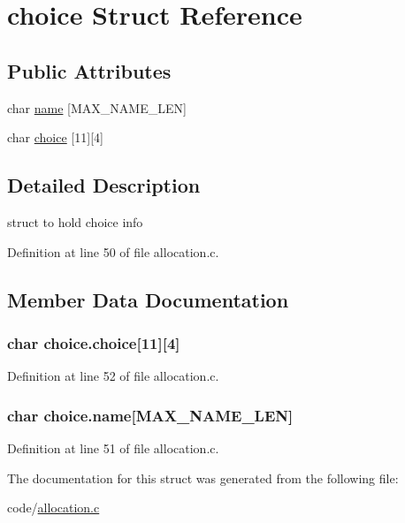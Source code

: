 \hypertarget{structchoice}{
\section{choice Struct Reference}
\label{structchoice}
}
\subsection*{Public Attributes}
\begin{DoxyCompactItemize}
\item 
char \hyperlink{structchoice_a6385591a8684ca883a69f2ef18ec0a5b}{name} \mbox{[}MAX\_\-NAME\_\-LEN\mbox{]}
\item 
char \hyperlink{structchoice_a261d0ea7417aa775dc50cb0d8c358cce}{choice} \mbox{[}11\mbox{]}\mbox{[}4\mbox{]}
\end{DoxyCompactItemize}


\subsection{Detailed Description}
struct to hold choice info 

Definition at line 50 of file allocation.c.



\subsection{Member Data Documentation}
\hypertarget{structchoice_a261d0ea7417aa775dc50cb0d8c358cce}{
\subsubsection[{choice}]{\setlength{\rightskip}{0pt plus 5cm}char {\bf choice.choice}\mbox{[}11\mbox{]}\mbox{[}4\mbox{]}}}
\label{structchoice_a261d0ea7417aa775dc50cb0d8c358cce}


Definition at line 52 of file allocation.c.

\hypertarget{structchoice_a6385591a8684ca883a69f2ef18ec0a5b}{
\subsubsection[{name}]{\setlength{\rightskip}{0pt plus 5cm}char {\bf choice.name}\mbox{[}MAX\_\-NAME\_\-LEN\mbox{]}}}
\label{structchoice_a6385591a8684ca883a69f2ef18ec0a5b}


Definition at line 51 of file allocation.c.



The documentation for this struct was generated from the following file:\begin{DoxyCompactItemize}
\item 
code/\hyperlink{allocation_8c}{allocation.c}\end{DoxyCompactItemize}
